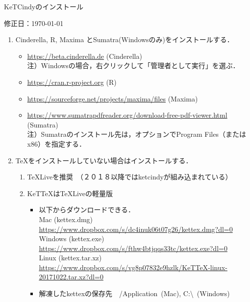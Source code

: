 \documentclass{ujarticle}
\begin{document}
\begin{center}
KeTCindyのインストール
\end{center}

\vspace{-5mm}

\hfill 修正日：\today

\begin{enumerate}[\bf\large 1.]
\item Cinderella, R, Maxima とSumatra(Windowsのみ)をインストールする．\vspace{-2mm}

 \begin{itemize}
 \item \url{https://beta.cinderella.de}  (Cinderella)\\
\hspace*{6mm}注）Windowsの場合，右クリックして「管理者として実行」を選ぶ．
 \item \url{https://cran.r-project.org}   (R)
 \item \url{https://sourceforge.net/projects/maxima/files}  (Maxima)
 \item \url{https://www.sumatrapdfreader.org/download-free-pdf-viewer.html} (Sumatra)\\
\hspace*{6mm}注）Sumatraのインストール先は，オプションでProgram Files（またはx86）を指定する．

 \end{itemize}
\item TeXをインストールしていない場合はインストールする．\vspace{-2mm}
 \begin{enumerate}[(1)]
 \item TeXLiveを推奨　（２０１８以降ではketcindyが組み込まれている）
 \item KeTTeXはTeXLiveの軽量版
    \begin{itemize}
    \item 以下からダウンロードできる．\\
    \hspace*{5mm}Mac (kettex.dmg)\\
    \hspace*{10mm}\url{https://www.dropbox.com/s/dc4inuk06t07g26/kettex.dmg?dl=0}\\
    \hspace*{5mm}Windows (kettex.exe)\\
    \hspace*{10mm}\url{https://www.dropbox.com/s/fthw4btjqqs33tc/kettex.exe?dl=0}\\
    \hspace*{5mm}Linux (kettex.tar.xz)\\
    \hspace*{10mm}\url{https://www.dropbox.com/s/vg8p07832e9hzlk/KeTTeX-linux-20171022.tar.xz?dl=0}
     \item 解凍したkettexの保存先　/Application\ (Mac), C:\textbackslash\ (Windows)\end{itemize}
 \end{enumerate}


\end{enumerate}
\end{document}
